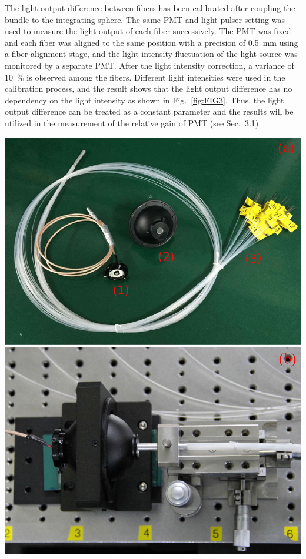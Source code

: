 \documentclass[a4paper,10pt,twoside]{cpc-hepnp}
\begin{document}
\begin{CJK*}{UTF8}{gbsn}
\begin{multicols}{2}
The light output difference between fibers has been calibrated after coupling the bundle to the integrating sphere.
The same PMT and light pulser setting was used to measure the light output of each fiber successively.
The PMT was fixed and each fiber was aligned to the same position with a precision of \SI{0.5}{\milli\meter} using a fiber alignment stage, and the light intensity fluctuation of the light source was monitored by a separate PMT.
After the light intensity correction, a variance of \SI{10}{\percent} is observed among the fibers.
Different light intensities were used in the calibration process, and the result shows that the light output difference has no dependency on the light intensity as shown in Fig.~\ref{fig:FIG3}. 
Thus, the light output difference can be treated as a constant parameter and the results will be utilized in the measurement of the relative gain of PMT (see Sec.~3.1)

\begin{center}
	\includegraphics[width=\linewidth]{FIG3}
\end{center} 


\end{multicols}
\end{CJK*}
\end{document}
